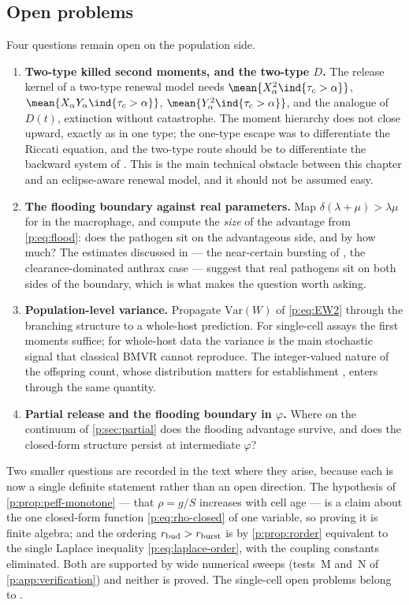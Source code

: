\subsection{Open problems}
\label{p:sec:open-problems}

Four questions remain open on the population side.

\begin{enumerate}
\item \textbf{Two-type killed second moments, and the two-type $D$.} The
release kernel of a two-type renewal model needs
$\mean{X_\alpha^2\ind\{\tau_c>\alpha\}}$,
$\mean{X_\alpha Y_\alpha\ind\{\tau_c>\alpha\}}$,
$\mean{Y_\alpha^2\ind\{\tau_c>\alpha\}}$, and the analogue of $D(t)$,
extinction without catastrophe. The moment hierarchy does not close upward,
exactly as in one type; the one-type escape was to differentiate the Riccati
equation, and the two-type route should be to differentiate the backward
system of \ChTwoType{}. This is the main technical obstacle between this
chapter and an eclipse-aware renewal model, and it should not be assumed
easy.
\item \textbf{The flooding boundary against real parameters.} Map
$\delta(\lambda+\mu)>\lambda\mu$ for \yp{} in the macrophage, and compute
the \emph{size} of the advantage from \cref{p:eq:flood}: does the pathogen
sit on the advantageous side, and by how much? The estimates discussed in \ChDist{} --- the near-certain bursting of \ft{}
\cite{carruthers2020stochastic}, the clearance-dominated anthrax case ---
suggest that real pathogens sit on both sides of the boundary, which is what
makes the question worth asking.
\item \textbf{Population-level variance.} Propagate $\mathrm{Var}(W)$ of
\cref{p:eq:EW2} through the branching structure to a whole-host prediction.
For single-cell assays the first moments suffice; for whole-host data the
variance is the main stochastic signal that classical BMVR cannot
reproduce. The integer-valued nature of the offspring count, whose
distribution matters for establishment
\cite{williams2024reproduction}, enters through the same quantity.
\item \textbf{Partial release and the flooding boundary in $\varphi$.}
Where on the continuum of \cref{p:sec:partial} does the flooding advantage
survive, and does the closed-form structure persist at intermediate
$\varphi$?
\end{enumerate}

Two smaller questions are recorded in the text where they arise, because
each is now a single definite statement rather than an open direction. The
hypothesis of \cref{p:prop:peff-monotone} --- that $\rho=g/S$ increases with
cell age --- is a claim about the one closed-form function
\cref{p:eq:rho-closed} of one variable, so proving it is finite algebra; and
the ordering $r_{\rm bud}>r_{\rm burst}$ is by \cref{p:prop:rorder}
equivalent to the single Laplace inequality \cref{p:eq:laplace-order}, with
the coupling constants eliminated. Both are supported by wide numerical
sweeps (tests~M and~N of \cref{p:app:verification}) and neither is proved.
The single-cell open problems belong to \ChDist{}.

